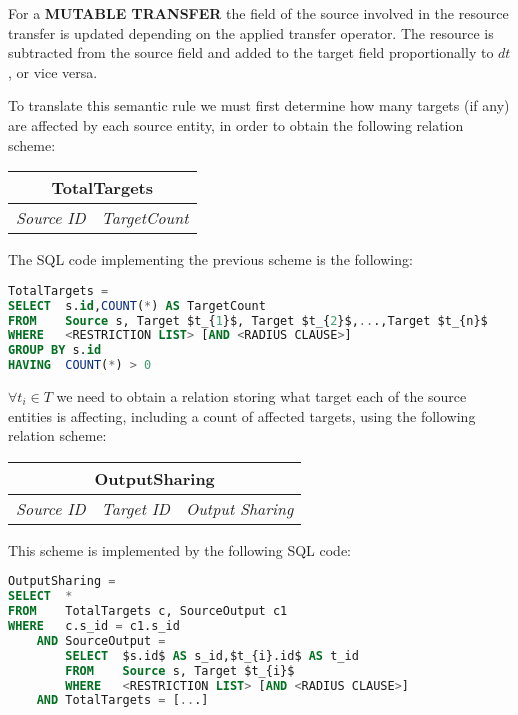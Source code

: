For a \textbf{MUTABLE TRANSFER} the field of the source involved in the resource
transfer is updated depending on the applied transfer
operator. The resource is subtracted from
the source field and added to the target field proportionally to
$dt$, or vice versa.

To translate this semantic rule we must first determine how many
targets (if any) are affected by each source entity, in order to
obtain the following relation scheme:

\begin{center}
\begin{tabular}
{| c | c |}
\hline
\multicolumn{2}{|c|}{TotalTargets} \\
\hline
\textit{Source ID} & \textit{TargetCount} \\
\hline
\end{tabular}
\end{center}

The SQL code implementing the previous scheme is the following:

\begin{lstlisting}[language=sql]
TotalTargets =
SELECT	s.id,COUNT(*) AS TargetCount
FROM	Source s, Target $t_{1}$, Target $t_{2}$,...,Target $t_{n}$
WHERE	<RESTRICTION LIST> [AND <RADIUS CLAUSE>]
GROUP BY s.id
HAVING	COUNT(*) > 0
\end{lstlisting}

$\forall t_{i} \in T$ we need to obtain a relation storing what target each of the source entities is affecting, including a count of affected targets, using the following relation scheme:

\begin{center}
\begin{tabular}
{| c | c | c |}
\hline
\multicolumn{3}{|c|}{OutputSharing} \\
\hline
\textit{Source ID} & \textit{Target ID} & \textit{Output Sharing}\\
\hline
\end{tabular}
\end{center}

This scheme is implemented by the following SQL code: %

\begin{lstlisting}[language=sql]
OutputSharing =
SELECT	*
FROM	TotalTargets c, SourceOutput c1
WHERE	c.s_id = c1.s_id
	AND SourceOutput =
		SELECT	$s.id$ AS s_id,$t_{i}.id$ AS t_id
		FROM	Source s, Target $t_{i}$
		WHERE	<RESTRICTION LIST> [AND <RADIUS CLAUSE>]
	AND TotalTargets = [...]
\end{lstlisting}

